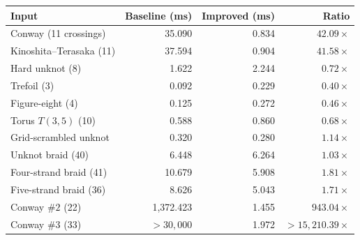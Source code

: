 \begin{tabular}{lrrr}
\toprule
Input & Baseline (ms) & Improved (ms) & Ratio \\
\midrule
Conway (11 crossings) & 35.090 & 0.834 & $42.09\times$ \\
Kinoshita--Terasaka (11) & 37.594 & 0.904 & $41.58\times$ \\
Hard unknot (8) & 1.622 & 2.244 & $0.72\times$ \\
Trefoil (3) & 0.092 & 0.229 & $0.40\times$ \\
Figure-eight (4) & 0.125 & 0.272 & $0.46\times$ \\
Torus $T(3,5)$ (10) & 0.588 & 0.860 & $0.68\times$ \\
Grid-scrambled unknot & 0.320 & 0.280 & $1.14\times$ \\
Unknot braid (40) & 6.448 & 6.264 & $1.03\times$ \\
Four-strand braid (41) & 10.679 & 5.908 & $1.81\times$ \\
Five-strand braid (36) & 8.626 & 5.043 & $1.71\times$ \\
Conway $\#2$ (22) & 1,372.423 & 1.455 & $943.04\times$ \\
Conway $\#3$ (33) & $>30,000$ & 1.972 & $>15,210.39\times$ \\
\bottomrule
\end{tabular}
